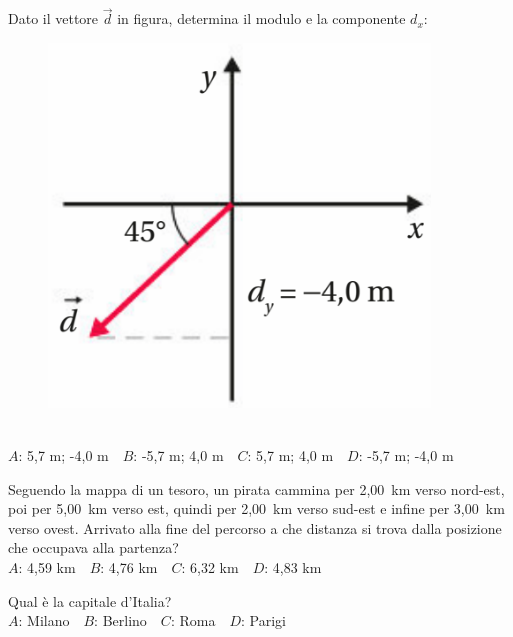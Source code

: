 \mcquestionheader Dato il vettore $\vec{d}$ in figura, determina il modulo e la componente $d_x$: \begin{figure}[h!]   \begin{center}     \includegraphics[scale=0.35]{vettored.png}   \end{center} \end{figure}\\
{$A$}: 5,7 m; -4,0 m\ \ {$B$}: -5,7 m; 4,0 m\ \ {$C$}: 5,7 m; 4,0 m\ \ {$D$}: -5,7 m; -4,0 m\ \ 

\mcquestionfooter



\def\mcquestionnumber{2}


\mcquestionheader Seguendo la mappa di un tesoro, un pirata cammina per 2,00~km verso nord-est, poi per 5,00~km verso est, quindi per 2,00~km verso sud-est e infine per 3,00~km verso ovest. Arrivato alla fine del percorso a che distanza si trova dalla posizione che occupava alla partenza?\\
{$A$}: 4,59 km\ \ {$B$}: 4,76 km\ \ {$C$}: 6,32 km\ \ {$D$}: 4,83 km\ \ 

\mcquestionfooter



\def\mcquestionnumber{3}


\mcquestionheader Qual è la capitale d’Italia?\\
{$A$}: Milano\ \ {$B$}: Berlino\ \ {$C$}: Roma\ \ {$D$}: Parigi\ \ 

\mcquestionfooter



\def\mcquestionnumber{4}



